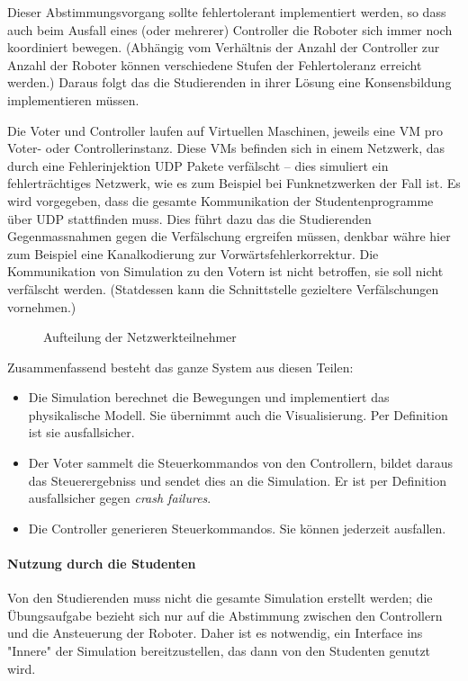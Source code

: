 Dieser Abstimmungsvorgang sollte fehlertolerant implementiert werden, so dass auch beim Ausfall eines (oder mehrerer) Controller die Roboter sich immer noch koordiniert bewegen.
(Abh{\"{a}}ngig vom Verh{\"{a}}ltnis der Anzahl der Controller zur Anzahl der Roboter k{\"{o}}nnen verschiedene Stufen der Fehlertoleranz erreicht werden.\cite[s.149]{Werner00})
Daraus folgt das die Studierenden in ihrer L{\"{o}}sung eine Konsensbildung implementieren m{\"{u}}ssen.

Die Voter und Controller laufen auf Virtuellen Maschinen, jeweils eine VM pro Voter- oder Controllerinstanz.
Diese VMs befinden sich in einem Netzwerk, das durch eine Fehlerinjektion UDP Pakete verf{\"{a}}lscht --
dies simuliert ein fehlertr{\"{a}}chtiges Netzwerk, wie es zum Beispiel bei Funknetzwerken der Fall ist.
Es wird vorgegeben, dass die gesamte Kommunikation der Studentenprogramme {\"{u}}ber UDP stattfinden muss.
Dies f{\"{u}}hrt dazu das die Studierenden Gegenmassnahmen gegen die Verf{\"{a}}lschung ergreifen m{\"{u}}ssen, denkbar
w{\"{a}}hre hier zum Beispiel eine Kanalkodierung zur Vorw{\"{a}}rtsfehlerkorrektur.
Die Kommunikation von Simulation zu den Votern ist nicht betroffen, sie soll nicht verf{\"{a}}lscht werden. (Statdessen
kann die Schnittstelle gezieltere Verf{\"{a}}lschungen vornehmen.)

\begin{figure}
	\centering
	\caption{Aufteilung der Netzwerkteilnehmer}
	\label{fig:network}
\end{figure}

Zusammenfassend besteht das ganze System aus diesen Teilen:
\begin{itemize}
	\item Die Simulation berechnet die Bewegungen und implementiert das physikalische Modell. Sie {\"{u}}bernimmt auch die Visualisierung. Per Definition ist sie ausfallsicher.
	\item Der Voter sammelt die Steuerkommandos von den Controllern, bildet daraus das Steuerergebniss und sendet dies an die Simulation. Er ist per Definition ausfallsicher gegen \textit{crash failures}.
	\item Die Controller generieren Steuerkommandos. Sie k{\"{o}}nnen jederzeit ausfallen.
\end{itemize}

\paragraph{Nutzung durch die Studenten} Von den Studierenden muss nicht die gesamte Simulation erstellt werden;
die {\"{U}}bungsaufgabe bezieht sich nur auf die Abstimmung zwischen den Controllern und die Ansteuerung der Roboter.
Daher ist es notwendig, ein Interface ins "Innere" der Simulation bereitzustellen, das dann von den Studenten genutzt wird.

